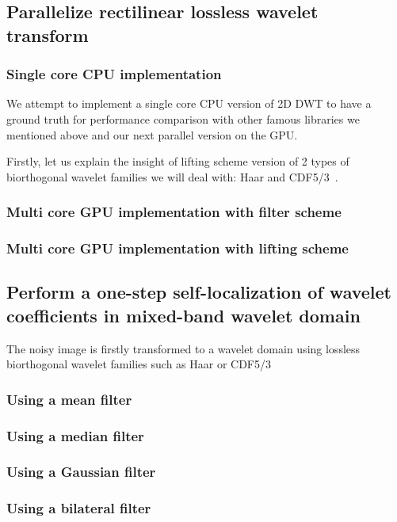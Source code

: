 

\subsection{Parallelize rectilinear lossless wavelet transform}
\subsubsection{Single core CPU implementation}
We attempt to implement a single core CPU version of 2D DWT to have a ground truth for performance comparison with other famous libraries we mentioned above and our next parallel version on the GPU.

Firstly, let us explain the insight of lifting scheme version of 2 types of biorthogonal wavelet families we will deal with: Haar and CDF5/3~\cite{daubechies1992ten}.

\subsubsection{Multi core GPU implementation with filter scheme}
\subsubsection{Multi core GPU implementation with lifting scheme}


\subsection{Perform a one-step self-localization of wavelet coefficients in mixed-band wavelet domain}
\label{subsec:onestepfilter}
The noisy image is firstly transformed to a wavelet domain using lossless biorthogonal wavelet families such as Haar or CDF5/3~\cite{daubechies1992ten}
\subsubsection{Using a mean filter}
\subsubsection{Using a median filter}
\subsubsection{Using a Gaussian filter}
\subsubsection{Using a bilateral filter}

